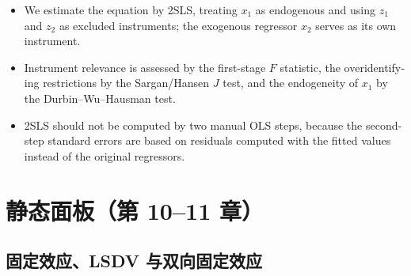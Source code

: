 \begin{english}
\begin{itemize}
  \item We estimate the equation by 2SLS, treating $x_1$ as endogenous and using $z_1$ and $z_2$ as excluded instruments; the exogenous regressor $x_2$ serves as its own instrument.
  \item Instrument relevance is assessed by the first-stage $F$ statistic, the overidentifying restrictions by the Sargan/Hansen $J$ test, and the endogeneity of $x_1$ by the Durbin--Wu--Hausman test.
  \item 2SLS should not be computed by two manual OLS steps, because the second-step standard errors are based on residuals computed with the fitted values instead of the original regressors.
\end{itemize}
\end{english}

\section{静态面板（第 10–11 章）}\label{sec:UappB-static}

\subsection{固定效应、LSDV 与双向固定效应}

